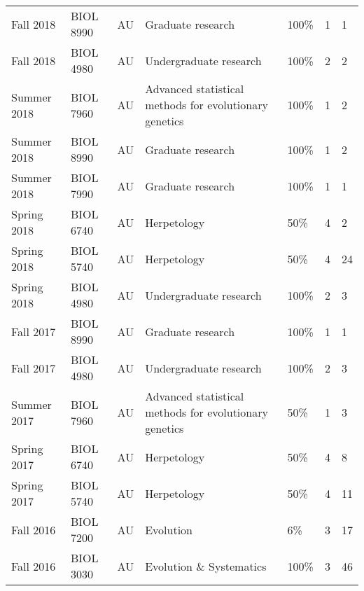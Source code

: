 {\begin{longtable}[l]{ p{0.79in} p{0.65in} p{0.60in} p{1.7in} p{0.58in} p{0.34in} p{0.70in} }
    Fall 2018 & BIOL 8990 & AU & Graduate research & 100\% & 1 & 1 \\ 
    Fall 2018 & BIOL 4980 & AU & Undergraduate research & 100\% & 2 & 2 \\ 
    Summer 2018 & BIOL 7960 & AU & Advanced statistical methods for evolutionary genetics & 100\% & 1 & 2 \\
    Summer 2018 & BIOL 8990 & AU & Graduate research & 100\% & 1 & 2 \\ 
    Summer 2018 & BIOL 7990 & AU & Graduate research & 100\% & 1 & 1 \\ 
    Spring 2018 & BIOL 6740 & AU & Herpetology & 50\% & 4 & 2 \\
    Spring 2018 & BIOL 5740 & AU & Herpetology & 50\% & 4 & 24 \\
    Spring 2018 & BIOL 4980 & AU & Undergraduate research & 100\% & 2 & 3 \\ 
    Fall 2017 & BIOL 8990 & AU & Graduate research & 100\% & 1 & 1 \\ 
    Fall 2017 & BIOL 4980 & AU & Undergraduate research & 100\% & 2 & 3 \\ 
    Summer 2017 & BIOL 7960 & AU & Advanced statistical methods for evolutionary genetics & 50\% & 1 & 3 \\
    Spring 2017 & BIOL 6740 & AU & Herpetology & 50\% & 4 & 8 \\
    Spring 2017 & BIOL 5740 & AU & Herpetology & 50\% & 4 & 11 \\
    Fall 2016 & BIOL 7200 & AU & Evolution & 6\% & 3 & 17 \\
    Fall 2016 & BIOL 3030 & AU & Evolution \& Systematics & 100\% & 3 & 46 \\
\end{longtable}
}
